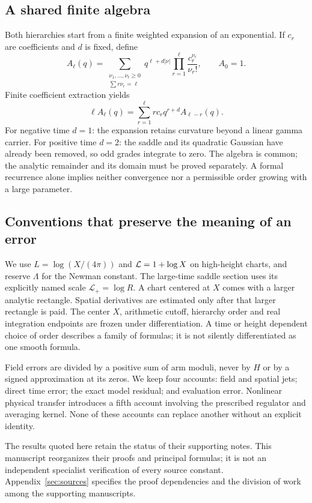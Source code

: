 \subsection{A shared finite algebra}
Both hierarchies start from a finite weighted expansion of an exponential.
If $c_r$ are coefficients and $d$ is fixed, define
\begin{equation}
 A_\ell(q)=\sum_{\substack{\nu_1,\ldots,\nu_\ell\ge0\\
                          \sum r\nu_r=\ell}}
 q^{\ell+d|\nu|}\prod_{r=1}^{\ell}\frac{c_r^{\nu_r}}{\nu_r!},
 \qquad A_0=1.
 \label{eq:finite-partition}
\end{equation}
Finite coefficient extraction yields
\begin{equation}
 \ell A_\ell(q)=\sum_{r=1}^{\ell}r c_r q^{r+d}A_{\ell-r}(q).
 \label{eq:shared-recurrence}
\end{equation}
For negative time $d=1$: the expansion retains curvature beyond a
linear gamma carrier. For positive time $d=2$: the saddle and its
quadratic Gaussian have already been removed, so odd grades integrate
to zero. The algebra is common; the analytic remainder and its domain
must be proved separately. A formal recurrence alone implies neither
convergence nor a permissible order growing with a large parameter.

\subsection{Conventions that preserve the meaning of an error}
We use $L=\log(X/(4\pi))$ and $\mathcal L=1+\log X$ on high-height charts, and reserve $\Lambda$ for the Newman constant. The large-time saddle section uses its explicitly named scale $\mathcal L_+=\log R$. A chart centered at $X$ comes with a larger analytic rectangle.
Spatial derivatives are estimated only after that larger rectangle is
paid. The center $X$, arithmetic cutoff, hierarchy order and real
integration endpoints are frozen under differentiation. A time or
height dependent choice of order describes a family of formulas; it is
not silently differentiated as one smooth formula.

Field errors are divided by a positive sum of arm moduli, never by
$H$ or by a signed approximation at its zeros. We keep four accounts:
field and spatial jets; direct time error; the exact model residual;
and evaluation error. Nonlinear physical transfer introduces a fifth
account involving the prescribed regulator and averaging kernel.
None of these accounts can replace another without an explicit identity.

The results quoted here retain the status of their supporting notes.
This manuscript reorganizes their proofs and principal formulas; it is
not an independent specialist verification of every source constant.
Appendix~\ref{sec:sources} specifies the proof dependencies and the
division of work among the supporting manuscripts.
